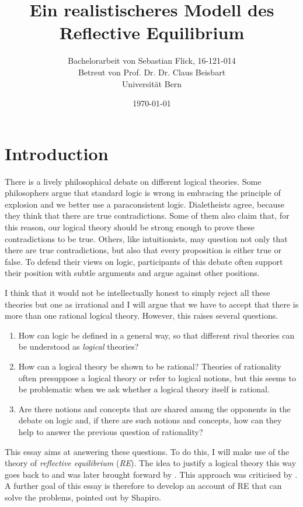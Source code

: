 \documentclass{article}
\title{Ein realistischeres Modell des Reflective Equilibrium}
\author{Bachelorarbeit von Sebastian Flick, 16-121-014\\Betreut von Prof. Dr. Dr. Claus Beisbart\\Universität Bern}
\date{\today}
\begin{document}
\maketitle
\section{Introduction}
There is a lively philosophical debate on different logical theories. Some philosophers argue that standard logic is wrong in embracing the principle of explosion and we better use a paraconsistent logic. Dialetheists agree, because they think that there are true contradictions. Some of them also claim that, for this reason, our logical theory should be strong enough to prove these contradictions to be true. Others, like intuitionists, may question not only that there are true contradictions, but also that every proposition is either true or false. To defend their views on logic, participants of this debate often support their position with subtle arguments and argue against other positions.

I think that it would not be intellectually honest to simply reject all these theories but one as irrational and I will argue that we have to accept that there is more than one rational logical theory. However, this raises several questions.

\begin{enumerate}
    \item How can logic be defined in a general way, so that different rival theories can be understood as \textit{logical} theories?
    \item How can a logical theory be shown to be rational? Theories of rationality often presuppose a logical theory or refer to logical notions, but this seems to be problematic when we ask whether a logical theory itself is rational.
    \item Are there notions and concepts that are shared among the opponents in the debate on logic and, if there are such notions and concepts, how can they help to answer the previous question of rationality?
\end{enumerate}

This essay aims at answering these questions. To do this, I will make use of the theory of \textit{reflective equilibrium} (\textit{RE}). The idea to justify a logical theory this way goes back to  and was later brought forward by . This approach was criticised by . A further goal of this essay is therefore to develop an account of RE that can solve the problems, pointed out by Shapiro.
\end{document}
